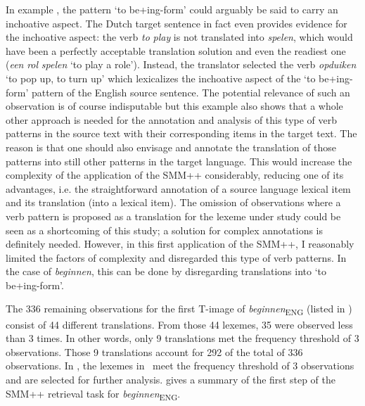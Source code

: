 \begin{enumerate}
In example , the pattern ‘to be+ing-form’ could arguably be said to carry an inchoative aspect. The Dutch target sentence in fact even provides evidence for the inchoative aspect: the verb \textit{to} \textit{play} is not translated into \textit{spelen}, which would have been a perfectly acceptable translation solution and even the readiest one (\textit{een} \textit{rol} \textit{spelen} `to play a role'). Instead, the translator selected the verb \textit{opduiken} `to pop up, to turn up' which lexicalizes the inchoative aspect of the ‘to be+ing-form’ pattern of the English source sentence. The potential relevance of such an observation is of course indisputable but this example also shows that a whole other approach is needed for the annotation and analysis of this type of verb patterns in the source text with their corresponding items in the target text. The reason is that one should also envisage and annotate the translation of those patterns into still other patterns in the target language. This would increase the complexity of the application of the SMM++ considerably, reducing one of its advantages, i.e. the straightforward annotation of a source language lexical item and its translation (into a lexical item). The omission of observations where a verb pattern is proposed as a translation for the lexeme under study could be seen as a shortcoming of this study; a solution for complex annotations is definitely needed. However, in this first application of the SMM++, I reasonably limited the factors of complexity and disregarded this type of verb patterns. In the case of \textit{beginnen}, this can be done by disregarding translations into ‘to be+ing-form’.
\end{enumerate}

The 336 remaining observations for the first T-image of \textit{beginnen}\textsubscript{ENG} (listed in ) consist of 44 different translations. From those 44 lexemes, 35 were observed less than 3 times. In other words, only 9 translations met the frequency threshold of 3 observations. Those 9 translations account for 292 of the total of 336 observations. In , the lexemes in \HightlightsName\ meet the frequency threshold of 3 observations and are selected for further analysis.  gives a summary of the first step of the SMM++ retrieval task for \textit{beginnen}\textsubscript{ENG}.


